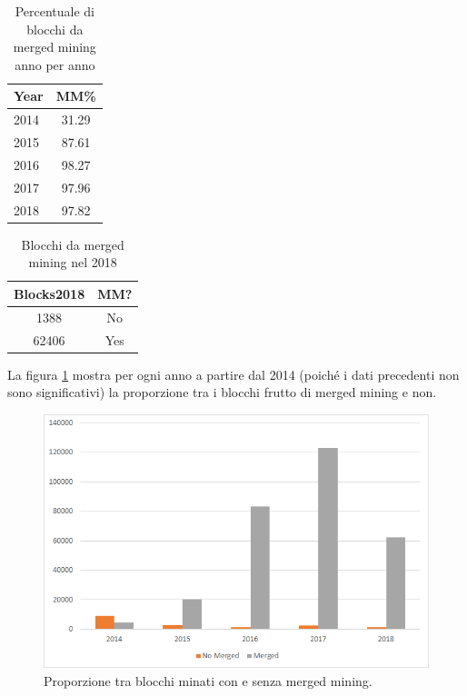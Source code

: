 \begin{table}
	\begin{center}
		\begin{tabular}{|l|c|}
			\hline 
			\textbf{Year} & \textbf{MM\%} \\ 
			\hline 
			2014 & 31.29 \\ 
			\hline 
			2015 & 87.61 \\ 
			\hline 
			2016 & 98.27 \\ 
			\hline 
			2017 & 97.96 \\ 
			\hline 
			2018 & 97.82 \\ 
			\hline 
		\end{tabular}
		\caption{Percentuale di blocchi da merged mining anno per anno}
	\end{center}
\end{table}
 
\begin{table}
	\begin{center}
		\begin{tabular}{|c|c|}
			\hline 
			\textbf{Blocks2018} & \textbf{MM?} \\ 
			\hline 
			1388 & No \\ 
			\hline
			62406 & Yes \\
			\hline
		\end{tabular}
		\caption{Blocchi da merged mining nel 2018}
	\end{center}
\end{table}


La figura \ref{fig:nomerged-vs-merged} mostra per ogni anno a partire dal 2014 (poiché i dati precedenti non sono significativi) la proporzione tra i blocchi frutto di merged mining e non.

\begin{figure}[h!]
	\centering
	\includegraphics[width=1.0\linewidth]{images/nomerged-vs-merged}
	\caption{Proporzione tra blocchi minati con e senza merged mining.}
	\label{fig:nomerged-vs-merged}
\end{figure}


